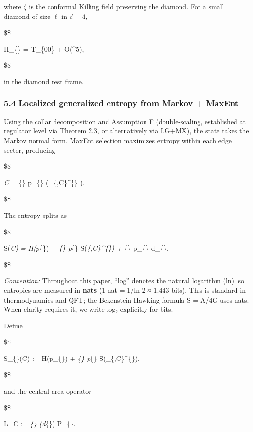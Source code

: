\documentclass[11pt,a4paper]{article}
\theoremstyle{remark}
\begin{document}
where \(\zeta\) is the conformal Killing field preserving the diamond. For a small
diamond of size \(\ell\) in \(d=4\),

\$\$

\delta \langle H\_\{\zeta\} \rangle =  \delta \langle T\_\{00\} \rangle + O(\ell\^{}5),

\$\$

in the diamond rest frame.

\subsubsection{5.4 Localized generalized entropy from Markov + MaxEnt}\label{localized-generalized-entropy-from-markov-maxent}

Using the collar decomposition and Assumption F (double-scaling, established
at regulator level via Theorem 2.3, or alternatively via LG+MX), the state
takes the Markov normal form. MaxEnt selection
maximizes entropy within each edge sector,
producing

\$\$

\rho\emph{C = \bigoplus}\{\alpha\} p\_\{\alpha\}
\left(\rho\_\{,C\}\^{}\{\alpha\} \otimes {}\right).

\$\$

The entropy splits as

\$\$

S(\rho\emph{C) = H(p}\{\alpha\}) + \sum\emph{\{\alpha\} p}\{\alpha\} S(\rho\emph{\{,C\}\^{}\{\alpha\}) + \sum}\{\alpha\} p\_\{\alpha\} \log d\_\{\alpha\}.

\$\$

\emph{Convention:} Throughout this paper, ``log'' denotes the natural logarithm (ln),
so entropies are measured in \textbf{nats} (1 nat = 1/ln 2 ≈ 1.443 bits). This is
standard in thermodynamics and QFT; the Bekenstein-Hawking formula S = A/4G
uses nats. When clarity requires it, we write log₂ explicitly for bits.

Define

\$\$

S\_\{\}(C) := H(p\_\{\alpha\}) + \sum\emph{\{\alpha\} p}\{\alpha\} S(\rho\_\{,C\}\^{}\{\alpha\}),

\$\$

and the central area operator

\$\$

L\_C := \sum\emph{\{\alpha\} (\log d}\{\alpha\}) P\_\{\alpha\}.
\end{document}
